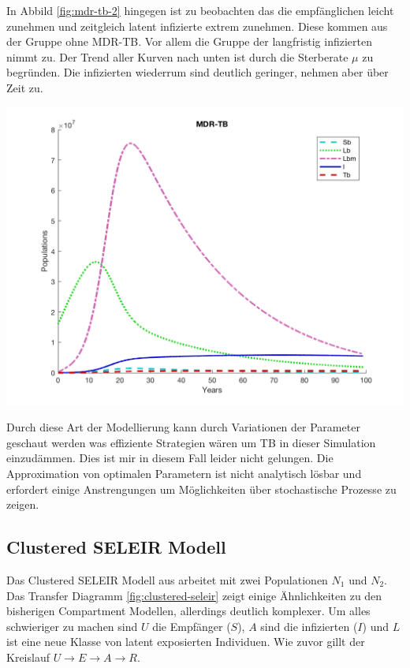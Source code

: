 \documentclass[paper=a4, fontsize=11pt, ngerman, abstract=on]{scrartcl}
\numberwithin{equation}{section} %
\numberwithin{figure}{section} %
\numberwithin{table}{section} %
\begin{document}
\begin{minipage}{0.4\linewidth}
  In Abbild \ref{fig:mdr-tb-2} hingegen ist zu beobachten das die empfänglichen leicht zunehmen und zeitgleich latent infizierte extrem zunehmen. Diese kommen aus der Gruppe ohne MDR-TB. Vor allem die Gruppe der langfristig infizierten nimmt zu. Der Trend aller Kurven nach unten ist durch die Sterberate $\mu$ zu begründen. Die infizierten wiederrum sind deutlich geringer, nehmen aber über Zeit zu.
\end{minipage}\hfill
\begin{minipage}{0.6\linewidth}
  \includegraphics[width=\linewidth]{images/mdr_tb_2}
  \label{fig:mdr-tb-2}
\end{minipage}

Durch diese Art der Modellierung kann durch Variationen der Parameter geschaut werden was effiziente Strategien wären um TB in dieser Simulation einzudämmen. Dies ist mir in diesem Fall leider nicht gelungen. Die Approximation von optimalen Parametern ist nicht analytisch lösbar und erfordert einige Anstrengungen um Möglichkeiten über stochastische Prozesse zu zeigen.

\subsection{Clustered SELEIR Modell}

Das Clustered SELEIR Modell aus \cite{ModellingTBEpidemics2009} arbeitet mit zwei Populationen $N_{1}$ und $N_{2}$. Das Transfer Diagramm \ref{fig:clustered-seleir} zeigt einige Ähnlichkeiten zu den bisherigen Compartment Modellen, allerdings deutlich komplexer. Um alles schwieriger zu machen sind $U$ die Empfänger ($S$), $A$ sind die infizierten ($I$) und $L$ ist eine neue Klasse von latent exposierten Individuen. Wie zuvor gillt der Kreislauf $U \rightarrow E \rightarrow A \rightarrow R$.
\end{document}
